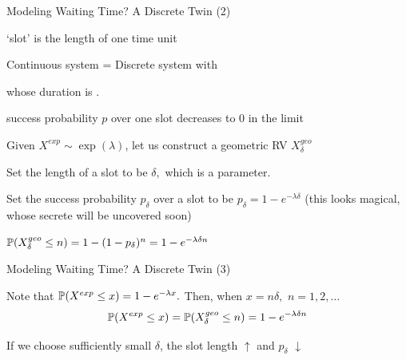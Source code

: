 \begin{frame}{Modeling Waiting Time? A Discrete Twin (2)}

\plitemsep 0.05in
\bci

\item `slot' is the length of one time unit

\item Continuous system = Discrete system with
\bci
\item {} whose duration is .
\item success probability $p$ over one slot decreases to 0 in the limit
\eci

\item Given $X^{exp} \sim \exp(\lambda)$, let us construct a geometric RV $X^{geo}_\delta$

\bci
\item Set the length of a slot to be $\delta,$ which is a parameter.
\item Set the success probability $p_\delta$ over a slot to be $p_\delta = 1 - e^{-\lambda \delta}$ (this looks magical, whose secrete will be uncovered soon)
\item $\mathbb{P}( X^{geo}_\delta \leq n ) = 1-(1-p_\delta)^n = 1- e^{-\lambda \delta n}$
\eci
%

\eci
\end{frame}

\begin{frame}{Modeling Waiting Time? A Discrete Twin (3)}


\vspace{-0.5cm}
\plitemsep 0.07in
\bci

\item<2-> Note that $\mathbb{P}( X^{exp} \leq x ) = 1- e^{-\lambda x}.$ Then, when $x = n\delta,$ $n=1, 2, \ldots$
$$
\mathbb{P}( X^{exp} \leq x ) = \mathbb{P}( X^{geo}_\delta \leq n ) = 1- e^{-\lambda \delta n}
$$

\item<3-> If we choose sufficiently small $\delta$, the slot length $\uparrow$ and $p_\delta$ $\downarrow$
\eci

\end{frame}

